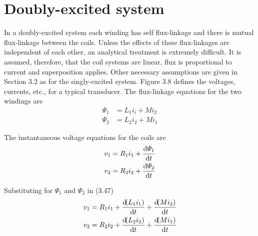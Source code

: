\documentclass[a4paper,numbers=noenddot,12pt]{scrbook}
\begin{document}
            \section{Doubly-excited system} 
            In a doubly-excited system each winding has self flux-linkage and there is mutual flux-linkage between the coils. Unless the effects of these flux-linkages are independent of each other, an analytical treatment is extremely difficult. It is assumed, therefore, that the coil systems are linear, flux is proportional to current and superposition applies. Other necessary assumptions are given in Section 3.2 as for the singly-excited system. 
            Figure 3.8 defines the voltages, currents, etc., for a typical transducer. The flux-linkage equations for the two windings are
            \begin{equation}
                \begin{aligned}
                    \varPsi_1 & = L_1 i_i + M i_2 \\
                    \varPsi_2 & = L_2 i_2 + M i_1
                \end{aligned}
                \label{eq:Eq3.46}
            \end{equation}

            The instantaneous voltage equations for the coils are
            \begin{equation}
                \begin{aligned}
                    v_1 & = R_1 i_1 + \dfrac{\dif \varPsi_1}{\dif t} \\
                    v_2 & = R_2 i_2 + \dfrac{\dif \varPsi_2}{\dif t}
                \end{aligned}
                \label{eq:Eq3.47}
            \end{equation}

            Substituting for $\varPsi_1$ and $\varPsi_2$ in (3.47)
            \begin{equation}
                \begin{aligned}
                    v_1 & = R_1 i_1 + \dfrac{\dif (L_1 i_1)}{\dif t} + \dfrac{\dif(M i_2)}{\dif t} \\
                    v_2 & = R_2 i_2 + \dfrac{\dif (L_2 i_2)}{\dif t} + \dfrac{\dif(M i_1)}{\dif t} 
                \end{aligned}
                \label{eq:Eq3.48}
            \end{equation}
\end{document}
